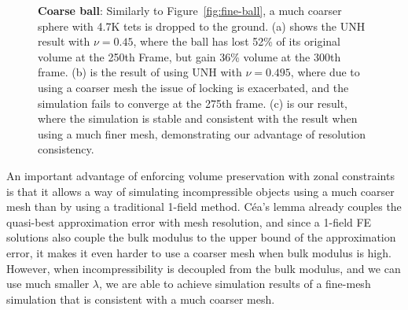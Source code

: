 \begin{figure}
\begin{subfigure}{.16\linewidth}
	\end{subfigure}%
	\begin{subfigure}{.16\linewidth}
	\end{subfigure}%
	\begin{subfigure}{.16\linewidth}
	\end{subfigure}%
	\begin{subfigure}{.16\linewidth}
	\end{subfigure}%
	\begin{subfigure}{.16\linewidth}
	\end{subfigure}%
	\caption{\textbf{Coarse ball}: Similarly to Figure~\ref{fig:fine-ball}, a much coarser sphere with 4.7K tets is dropped to the ground. (a) shows the UNH result  with $\nu = 0.45$, where the ball has lost 52\% of its original volume at the 250th Frame, but gain 36\% volume at the 300th frame. (b) is the result of using UNH with $\nu = 0.495$, where due to using a coarser mesh the issue of locking is exacerbated, and the simulation fails to converge at the 275th frame. (c) is our result, where the simulation is stable and consistent with the result when using a much finer mesh, demonstrating our advantage of resolution consistency. } \label{fig:coarse-ball}
\end{figure}

An important advantage of enforcing volume preservation with zonal constraints is that it allows a way of simulating incompressible
objects using a much coarser mesh than by using a traditional 1-field method. C\'ea's lemma already couples the quasi-best approximation error 
with mesh resolution, and since a 1-field FE solutions also couple the bulk modulus to the upper bound of the approximation error, it makes it 
even harder to use a coarser mesh when bulk modulus is high. However, when incompressibility is decoupled from the bulk modulus, and we can 
use much smaller $\lambda$, we are able to achieve simulation results of a fine-mesh simulation that is consistent with a much coarser mesh. 


